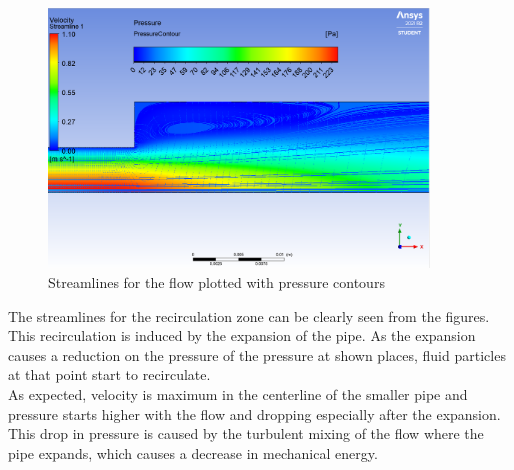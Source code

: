 \begin{figure}[H]
    \centering
    \includegraphics[width=0.9\textwidth]{images/task1/streamline_w_pressure.png}
    \caption{Streamlines for the flow plotted with pressure contours}
    \label{fig:stream_w_pressure}
\end{figure}

\noindent The streamlines for the recirculation zone can be clearly seen from the figures. This recirculation is induced by the expansion of the pipe. As the expansion causes a reduction on the pressure of the pressure at shown places, fluid particles at that point start to recirculate. \\

\noindent As expected, velocity is maximum in the centerline of the smaller pipe and pressure starts higher with the flow and dropping especially after the expansion. This drop in pressure is caused by the turbulent mixing of the flow where the pipe expands, which causes a decrease in mechanical energy.



